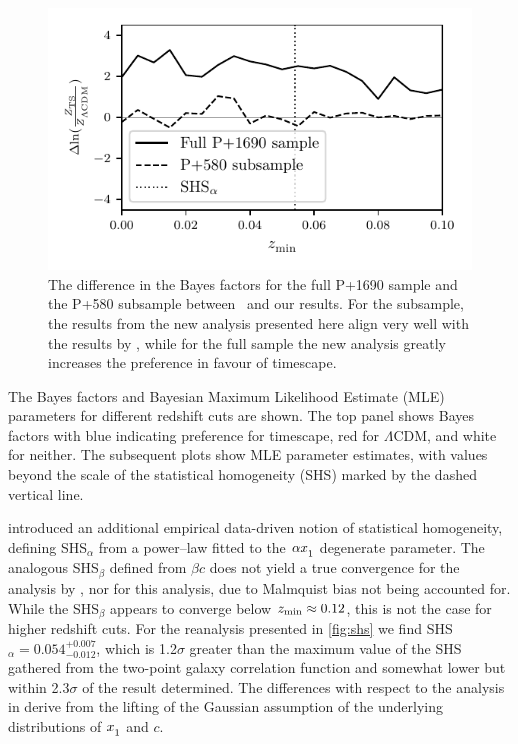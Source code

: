 \documentclass[fleqn,usenatbib,onecolumn,referee]{mnras}
\newcommand{\LA}{\Lambda}
\newcommand{\LCDM}{$\LA$CDM}
\newcommand{\laneetal}{\citet{Lane_2023}}
\newcommand{\Z}[1]{_{\lower2pt\hbox{$\scriptstyle#1$}}}
\newcommand{\ns}[1]{_{\rm #1}}
\newcommand{\zmin}{z\ns{min}}
\begin{document}
\begin{figure}
    \includegraphics[width=\columnwidth]{images/residuals.pdf}
    \caption{The difference in the Bayes factors for the full P+1690 sample and the P+580 subsample between \laneetal\ and our results. For the subsample, the results from the new analysis presented here align very well with the results by \laneetal, while for the full sample the new analysis greatly increases the preference in favour of timescape.}
    \label{fig:results580}
\end{figure}

The Bayes factors and Bayesian Maximum Likelihood Estimate (MLE) parameters for different redshift cuts are shown. The top panel shows Bayes factors with blue indicating preference for timescape, red for \LCDM, and white for neither. The subsequent plots show MLE parameter estimates, with values beyond the scale of the statistical homogeneity (SHS) marked by the dashed vertical line.

\citet{Lane_2023} introduced an additional empirical data-driven notion of statistical homogeneity, defining SHS$_\alpha$ from a power--law fitted to the $\alpha x \Z 1$ degenerate parameter. The analogous SHS$_\beta$ defined from $\beta c$ does not yield a true convergence for the analysis by \citet{Lane_2023}, nor for this analysis, due to Malmquist bias not being accounted for. While the SHS$_\beta$ appears to converge below $\zmin \approx 0.12$, this is not the case for higher redshift cuts. For the reanalysis presented in \cref{fig:shs} we find SHS$_\alpha = 0.054_{-0.012}^{+0.007}$, which is 1.2$\sigma$ greater than the maximum value of the SHS gathered from the two-point galaxy correlation function \citep{Hogg_2005, Scrimgeour_2012} and somewhat lower but within 2.3$\sigma$ of the result \citet{Lane_2023} determined. The differences with respect to the analysis in \citet{Lane_2023} derive from the lifting of the Gaussian assumption of the underlying distributions of $x\Z1$ and $c$.
\end{document}
